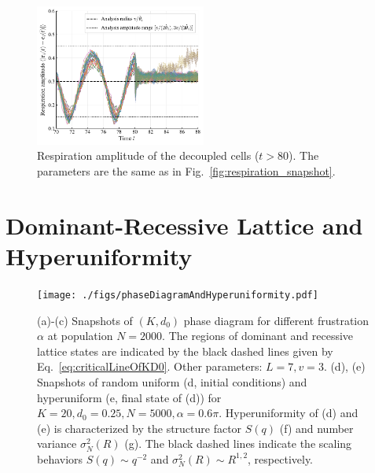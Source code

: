 \documentclass{article}
\begin{document}
\begin{figure}[H]
    \centering
    \includegraphics[width=0.5\textwidth]{./figs/respiration_amplitude_cells_decouled.pdf}
    \caption{
        Respiration amplitude of the decoupled cells ($t > 80$). The parameters are the same as in Fig.~\ref{fig:respiration_snapshot}.
    }
\end{figure}

\newpage
\section{\label{sec:hyperuniformity}Dominant-Recessive Lattice and Hyperuniformity}

\begin{figure}
    \centering
    \texttt{[image: ./figs/phaseDiagramAndHyperuniformity.pdf]}
    \caption{
        \label{fig:phaseDiagramAndHyperuniformity}
        (a)-(c) Snapshots of $(K, d_0)$ phase diagram for different frustration $\alpha$ at population $N=2000$. The regions of dominant and recessive lattice states are indicated by the black dashed lines given by Eq.~\eqref{eq:criticalLineOfKD0}. Other parameters: $L=7, v=3$.
        (d), (e) Snapshots of random uniform (d, initial conditions) and hyperuniform (e, final state of (d)) for $K=20, d_0=0.25, N=5000, \alpha=0.6\pi$.
        Hyperuniformity of (d) and (e) is characterized by the structure factor $S(q)$ (f) and number variance $\sigma _N^2(R)$ (g). The black dashed lines indicate the scaling behaviors $S(q)\sim q^{-2}$ and $\sigma _N^2(R)\sim R^{1,2}$, respectively.
    }
\end{figure}
\end{document}
